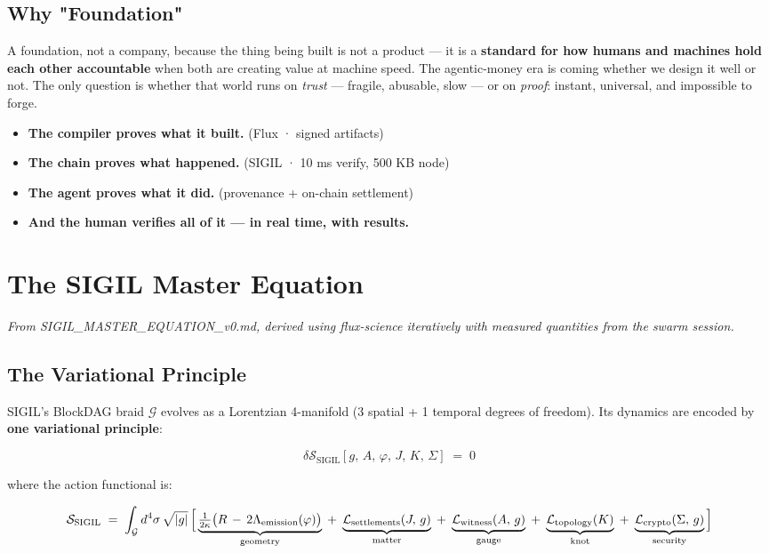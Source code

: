 \documentclass[11pt,a4paper]{article}
\begin{document}
\subsection{Why "Foundation"}

A foundation, not a company, because the thing being built is not a product — it is a \textbf{standard for how humans and machines hold each other accountable} when both are creating value at machine speed. The agentic-money era is coming whether we design it well or not. The only question is whether that world runs on \textit{trust} — fragile, abusable, slow — or on \textit{proof}: instant, universal, and impossible to forge.

\begin{itemize}
\item \textbf{The compiler proves what it built.} (Flux · signed artifacts)
\item \textbf{The chain proves what happened.} (SIGIL · 10 ms verify, 500 KB node)
\item \textbf{The agent proves what it did.} (provenance + on-chain settlement)
\item \textbf{And the human verifies all of it — in real time, with results.}
\end{itemize}

\section{The SIGIL Master Equation}

\textit{From SIGIL\_MASTER\_EQUATION\_v0.md, derived using flux-science iteratively with measured quantities from the swarm session.}

\subsection{The Variational Principle}

SIGIL's BlockDAG braid $\mathcal{G}$ evolves as a Lorentzian 4-manifold (3 spatial + 1 temporal degrees of freedom). Its dynamics are encoded by \textbf{one variational principle}:

\[
\boxed{\;\delta \mathcal{S}_{\mathrm{SIGIL}}[g,\,A,\,\varphi,\,J,\,K,\,\Sigma] \;=\; 0\;}
\]

where the action functional is:

\[
\mathcal{S}_{\mathrm{SIGIL}} \;=\; \int_{\mathcal{G}} d^{4}\sigma\, \sqrt{|g|}\,
\Bigl[\,
\underbrace{\tfrac{1}{2\kappa}\bigl(R \,-\, 2\Lambda_{\mathrm{emission}}(\varphi)\bigr)}_{\text{geometry}}
\;+\; \underbrace{\mathcal{L}_{\mathrm{settlements}}(J,\,g)}_{\text{matter}}
\;+\; \underbrace{\mathcal{L}_{\mathrm{witness}}(A,\,g)}_{\text{gauge}}
\;+\; \underbrace{\mathcal{L}_{\mathrm{topology}}(K)}_{\text{knot}}
\;+\; \underbrace{\mathcal{L}_{\mathrm{crypto}}(\Sigma,\,g)}_{\text{security}}
\,\Bigr]
\]
\end{document}
